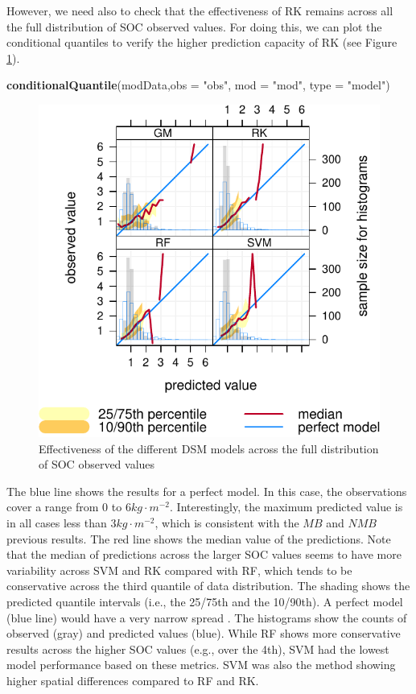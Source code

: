 \documentclass[10pt,b5paper,]{book}
\newenvironment{Shaded}{\begin{snugshade}}{\end{snugshade}}
\newcommand{\DataTypeTok}[1]{\textcolor[rgb]{0.13,0.29,0.53}{#1}}
\newcommand{\KeywordTok}[1]{\textcolor[rgb]{0.13,0.29,0.53}{\textbf{#1}}}
\newcommand{\NormalTok}[1]{#1}
\newcommand{\StringTok}[1]{\textcolor[rgb]{0.31,0.60,0.02}{#1}}
\theoremstyle{definition}
\theoremstyle{definition}
\theoremstyle{definition}
\theoremstyle{remark}
\begin{document}
However, we need also to check that the effectiveness of RK remains
across all the full distribution of SOC observed values. For doing this,
we can plot the conditional quantiles to verify the higher prediction
capacity of RK (see Figure \ref{fig:condquant}).

\begin{Shaded}
\begin{Highlighting}[]
\KeywordTok{conditionalQuantile}\NormalTok{(modData,}\DataTypeTok{obs =} \StringTok{"obs"}\NormalTok{, }\DataTypeTok{mod =} \StringTok{"mod"}\NormalTok{, }\DataTypeTok{type =} \StringTok{"model"}\NormalTok{)}
\end{Highlighting}
\end{Shaded}

\begin{figure}
\centering
\includegraphics{SOCMapping_files/figure-latex/condquant-1.pdf}
\caption{\label{fig:condquant}Effectiveness of the different DSM models
across the full distribution of SOC observed values}
\end{figure}

The blue line shows the results for a perfect model. In this case, the
observations cover a range from 0 to \(6 kg \cdot m^{-2}\).
Interestingly, the maximum predicted value is in all cases less than
\(3 kg \cdot m^{-2}\), which is consistent with the \(MB\) and \(NMB\)
previous results. The red line shows the median value of the
predictions. Note that the median of predictions across the larger SOC
values seems to have more variability across SVM and RK compared with
RF, which tends to be conservative across the third quantile of data
distribution. The shading shows the predicted quantile intervals (i.e.,
the 25/75th and the 10/90th). A perfect model (blue line) would have a
very narrow spread \citep{openair}. The histograms show the counts of
observed (gray) and predicted values (blue). While RF shows more
conservative results across the higher SOC values (e.g., over the 4th),
SVM had the lowest model performance based on these metrics. SVM was
also the method showing higher spatial differences compared to RF and
RK.
\end{document}
